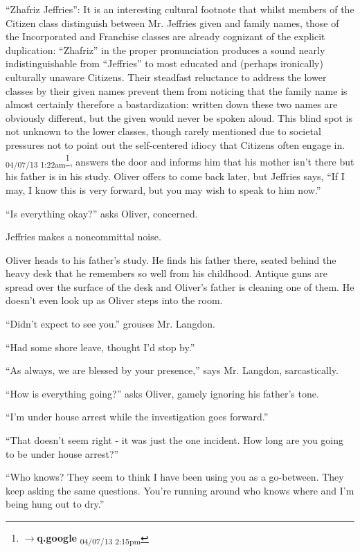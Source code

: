 {``Zhafriz Jeffries'': It is an interesting cultural footnote that whilst members of the Citizen class distinguish between Mr. Jeffries given and family names, those of the Incorporated and Franchise classes are already cognizant of the explicit duplication: ``Zhafriz'' in the proper pronunciation produces a sound nearly indistinguishable from ``Jeffries'' to most educated and (perhaps ironically) culturally unaware Citizens. Their steadfast reluctance to address the lower classes by their given names prevent them from noticing that the family name is almost certainly therefore a bastardization: written down these two names are obviously different, but the given would never be spoken aloud. This blind spot is not unknown to the lower classes, though rarely mentioned due to societal pressures not to point out the self-centered idiocy that Citizens often engage in. \textsubscript{04/07/13 1:22am}}\footnote{$\rightarrow$\textbf{q.google } \textsubscript{04/07/13 2:15pm}}, answers the door and informs him that his mother isn't there but his father is in his study.  Oliver offers to come back later, but Jeffries says, ``If I may, I know this is very forward, but you may wish to speak to him now.''

``Is everything okay?'' asks Oliver, concerned.

Jeffries makes a noncommittal noise.



Oliver heads to his father's study.  He finds his father there, seated behind the heavy desk that he remembers so well from his childhood.  Antique guns are spread over the surface of the desk and Oliver's father is cleaning one of them.  He doesn't even look up as Oliver steps into the room.

``Didn't expect to see you.'' grouses Mr. Langdon.

``Had some shore leave, thought I'd stop by.''

``As always, we are blessed by your presence,'' says Mr. Langdon, sarcastically.

``How is everything going?'' asks Oliver, gamely ignoring his father's tone.

``I'm under house arrest while the investigation goes forward.''

``That doesn't seem right - it was just the one incident.  How long are you going to be under house arrest?''

``Who knows?  They seem to think I have been using you as a go-between.  They keep asking the same questions.  You're running around who knows where and I'm being hung out to dry.''

